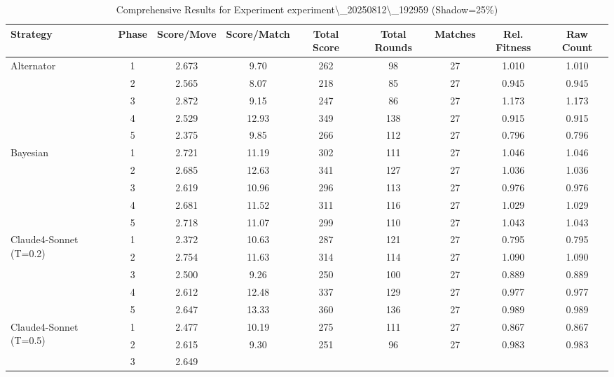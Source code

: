 \begin{table}[htbp]
\centering
\scriptsize
\caption{Comprehensive Results for Experiment experiment\textbackslash{}_20250812\textbackslash{}_192959 (Shadow=25\%)}
\label{tab:experiment_20250812_192959_comprehensive}
\begin{adjustbox}{width=\textwidth,center}
\begin{tabular}{|l|c|c|c|c|c|c|c|c|}
\hline
\textbf{Strategy} & \textbf{Phase} & \textbf{Score/Move} & \textbf{Score/Match} & \textbf{Total Score} & \textbf{Total Rounds} & \textbf{Matches} & \textbf{Rel. Fitness} & \textbf{Raw Count} \\
\hline
\multirow{5}{*}{Alternator} & 
1 & 
2.673 & 
9.70 & 
262 & 
98 & 
27 & 
1.010 & 
1.010 \\
 & 
2 & 
2.565 & 
8.07 & 
218 & 
85 & 
27 & 
0.945 & 
0.945 \\
 & 
3 & 
2.872 & 
9.15 & 
247 & 
86 & 
27 & 
1.173 & 
1.173 \\
 & 
4 & 
2.529 & 
12.93 & 
349 & 
138 & 
27 & 
0.915 & 
0.915 \\
 & 
5 & 
2.375 & 
9.85 & 
266 & 
112 & 
27 & 
0.796 & 
0.796 \\
\hline
\multirow{5}{*}{Bayesian} & 
1 & 
2.721 & 
11.19 & 
302 & 
111 & 
27 & 
1.046 & 
1.046 \\
 & 
2 & 
2.685 & 
12.63 & 
341 & 
127 & 
27 & 
1.036 & 
1.036 \\
 & 
3 & 
2.619 & 
10.96 & 
296 & 
113 & 
27 & 
0.976 & 
0.976 \\
 & 
4 & 
2.681 & 
11.52 & 
311 & 
116 & 
27 & 
1.029 & 
1.029 \\
 & 
5 & 
2.718 & 
11.07 & 
299 & 
110 & 
27 & 
1.043 & 
1.043 \\
\hline
\multirow{5}{*}{Claude4-Sonnet (T=0.2)} & 
1 & 
2.372 & 
10.63 & 
287 & 
121 & 
27 & 
0.795 & 
0.795 \\
 & 
2 & 
2.754 & 
11.63 & 
314 & 
114 & 
27 & 
1.090 & 
1.090 \\
 & 
3 & 
2.500 & 
9.26 & 
250 & 
100 & 
27 & 
0.889 & 
0.889 \\
 & 
4 & 
2.612 & 
12.48 & 
337 & 
129 & 
27 & 
0.977 & 
0.977 \\
 & 
5 & 
2.647 & 
13.33 & 
360 & 
136 & 
27 & 
0.989 & 
0.989 \\
\hline
\multirow{5}{*}{Claude4-Sonnet (T=0.5)} & 
1 & 
2.477 & 
10.19 & 
275 & 
111 & 
27 & 
0.867 & 
0.867 \\
 & 
2 & 
2.615 & 
9.30 & 
251 & 
96 & 
27 & 
0.983 & 
0.983 \\
 & 
3 & 
2.649 & 

\end{tabular}
\end{adjustbox}
\end{table}
